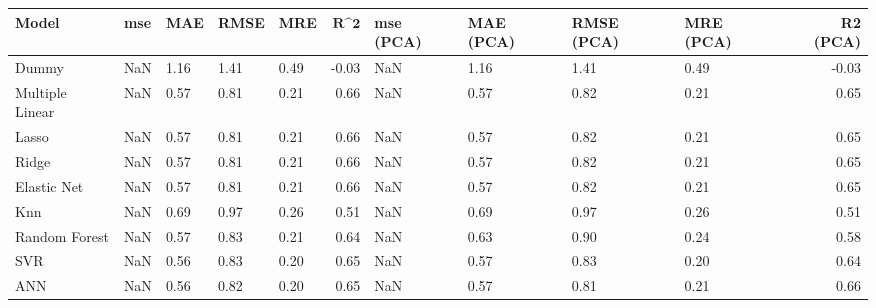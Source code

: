 \begin{table}
\centering
\label{table:iri_reg_pred}
\begin{tabular}{lllllrllllr}
\toprule
 \textbf{Model} & \textbf{mse} & \textbf{MAE} & \textbf{RMSE} & \textbf{MRE} & $\textbf{R^2}$ & \textbf{mse (PCA)} & \textbf{MAE (PCA)} & \textbf{RMSE (PCA)} & \textbf{MRE (PCA)} & \textbf{R2 (PCA)} \\
\midrule
          Dummy &          NaN &         1.16 &          1.41 &         0.49 &          -0.03 &                NaN &               1.16 &                1.41 &               0.49 &             -0.03 \\
Multiple Linear &          NaN &         0.57 &          0.81 &         0.21 &           0.66 &                NaN &               0.57 &                0.82 &               0.21 &              0.65 \\
          Lasso &          NaN &         0.57 &          0.81 &         0.21 &           0.66 &                NaN &               0.57 &                0.82 &               0.21 &              0.65 \\
          Ridge &          NaN &         0.57 &          0.81 &         0.21 &           0.66 &                NaN &               0.57 &                0.82 &               0.21 &              0.65 \\
    Elastic Net &          NaN &         0.57 &          0.81 &         0.21 &           0.66 &                NaN &               0.57 &                0.82 &               0.21 &              0.65 \\
            Knn &          NaN &         0.69 &          0.97 &         0.26 &           0.51 &                NaN &               0.69 &                0.97 &               0.26 &              0.51 \\
  Random Forest &          NaN &         0.57 &          0.83 &         0.21 &           0.64 &                NaN &               0.63 &                0.90 &               0.24 &              0.58 \\
            SVR &          NaN &         0.56 &          0.83 &         0.20 &           0.65 &                NaN &               0.57 &                0.83 &               0.20 &              0.64 \\
            ANN &          NaN &         0.56 &          0.82 &         0.20 &           0.65 &                NaN &               0.57 &                0.81 &               0.21 &              0.66 \\
\bottomrule
\end{tabular}
\end{table}
